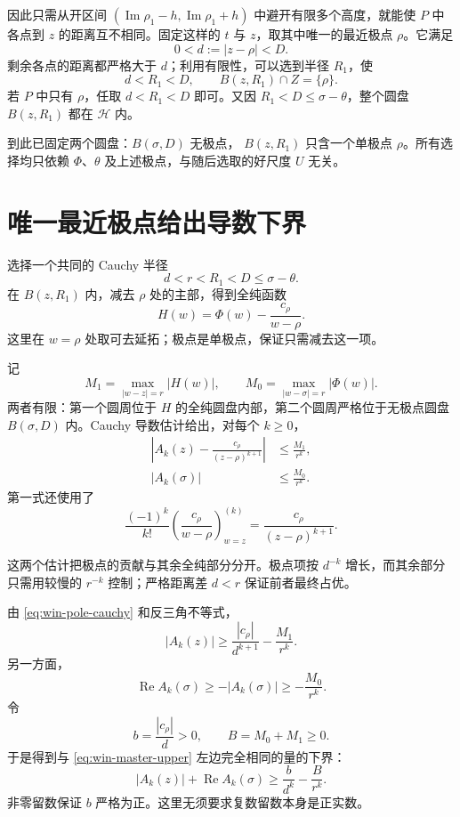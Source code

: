 \documentclass[UTF8,fontset=fandol,a4paper,openany,oneside]{ctexbook}
\theoremstyle{definition}
\theoremstyle{remark}
\begin{document}
因此只需从开区间
$(\operatorname{Im}\rho_1-h,\operatorname{Im}\rho_1+h)$
中避开有限多个高度，就能使 $P$ 中各点到 $z$ 的距离互不相同。固定这样的 $t$ 与 $z$，取其中唯一的最近极点 $\rho$。它满足
\[
 0<d:=|z-\rho|<D.
\]
剩余各点的距离都严格大于 $d$；利用有限性，可以选到半径 $R_1$，使
\begin{equation}
 d<R_1<D,\qquad B(z,R_1)\cap Z=\{\rho\}.
 \label{eq:win-isolated-disc}
\end{equation}
若 $P$ 中只有 $\rho$，任取 $d<R_1<D$ 即可。又因
$R_1<D\le\sigma-\theta$，整个圆盘 $B(z,R_1)$ 都在 $\mathcal H$ 内。

到此已固定两个圆盘：$B(\sigma,D)$ 无极点，
$B(z,R_1)$ 只含一个单极点 $\rho$。所有选择均只依赖 $\Phi$、$\theta$ 及上述极点，与随后选取的好尺度 $U$ 无关。

\section{唯一最近极点给出导数下界}

选择一个共同的 Cauchy 半径
\begin{equation}
 d<r<R_1<D\le\sigma-\theta.
 \label{eq:win-cauchy-radius}
\end{equation}
在 $B(z,R_1)$ 内，减去 $\rho$ 处的主部，得到全纯函数
\[
 H(w)=\Phi(w)-\frac{c_\rho}{w-\rho}.
\]
这里在 $w=\rho$ 处取可去延拓；极点是单极点，保证只需减去这一项。

记
\[
 M_1=\max_{|w-z|=r}|H(w)|,\qquad
 M_0=\max_{|w-\sigma|=r}|\Phi(w)|.
\]
两者有限：第一个圆周位于 $H$ 的全纯圆盘内部，第二个圆周严格位于无极点圆盘 $B(\sigma,D)$ 内。Cauchy 导数估计给出，对每个 $k\ge0$，
\begin{align}
 \left|A_k(z)-\frac{c_\rho}{(z-\rho)^{k+1}}\right|
       &\le\frac{M_1}{r^k},\label{eq:win-pole-cauchy}\\
 |A_k(\sigma)|&\le\frac{M_0}{r^k}.
 \label{eq:win-free-cauchy}
\end{align}
第一式还使用了
\[
 \frac{(-1)^k}{k!}
 \left(\frac{c_\rho}{w-\rho}\right)^{(k)}_{\!w=z}
   =\frac{c_\rho}{(z-\rho)^{k+1}}.
\]

这两个估计把极点的贡献与其余全纯部分分开。极点项按 $d^{-k}$ 增长，而其余部分只需用较慢的 $r^{-k}$ 控制；严格距离差 $d<r$ 保证前者最终占优。

由 \eqref{eq:win-pole-cauchy} 和反三角不等式，
\[
 |A_k(z)|\ge\frac{|c_\rho|}{d^{k+1}}-\frac{M_1}{r^k}.
\]
另一方面，
\[
 \operatorname{Re}A_k(\sigma)
       \ge-|A_k(\sigma)|\ge-\frac{M_0}{r^k}.
\]
令
\begin{equation}
 b=\frac{|c_\rho|}{d}>0,\qquad B=M_0+M_1\ge0.
 \label{eq:win-lower-constants}
\end{equation}
于是得到与 \eqref{eq:win-master-upper} 左边完全相同的量的下界：
\begin{equation}
 |A_k(z)|+\operatorname{Re}A_k(\sigma)
       \ge\frac b{d^k}-\frac B{r^k}.
 \label{eq:win-master-lower}
\end{equation}
非零留数保证 $b$ 严格为正。这里无须要求复数留数本身是正实数。
\end{document}
